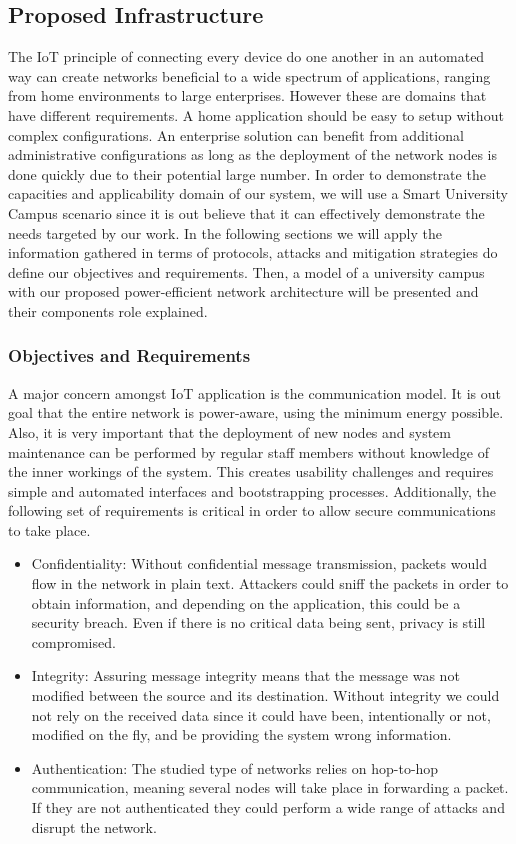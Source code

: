 \documentclass{sig-alternate-05-2015}
\begin{document}
\subsection{Proposed Infrastructure}
The \gls{IoT} principle of connecting every device do one another in an automated way can create networks beneficial to a wide spectrum of applications, ranging from home environments to large enterprises. However these are domains that have different requirements. A home application should be easy to setup without complex configurations. An enterprise solution can benefit from additional administrative configurations as long as the deployment of the network nodes is done quickly due to their potential large number. In order to demonstrate the capacities and applicability domain of our system, we will use a Smart University Campus scenario since it is out believe that it can effectively demonstrate the needs targeted by our work.
In the following sections we will apply the information gathered in terms of protocols, attacks and mitigation strategies do define our objectives and requirements. Then, a model of a university campus with our proposed power-efficient network architecture will be presented and their components role explained.


\subsubsection{Objectives and Requirements}
A major concern amongst \gls{IoT} application is the communication model. It is out goal that the entire network is power-aware, using the minimum energy possible. Also, it is very important that the deployment of new nodes and system maintenance can be performed by regular staff members without knowledge of the inner workings of the system. This creates usability challenges and requires simple and automated interfaces and bootstrapping processes. Additionally, the following set of requirements is critical in order to allow secure communications to take place.
\begin{itemize}
	\item Confidentiality: Without confidential message transmission, packets would flow in the network in plain text. Attackers could sniff the packets in order to obtain information, and depending on the application, this could be a security breach. Even if there is no critical data being sent, privacy is still compromised.
	\item Integrity: Assuring message integrity means that the message was not modified between the source and its destination. Without integrity we could not rely on the received data since it could have been, intentionally or not, modified on the fly, and be providing the system wrong information.
	\item Authentication: The studied type of networks relies on hop-to-hop communication, meaning several nodes will take place in forwarding a packet. If they are not authenticated they could perform a wide range of attacks and disrupt the network.
\end{itemize}
\end{document}
